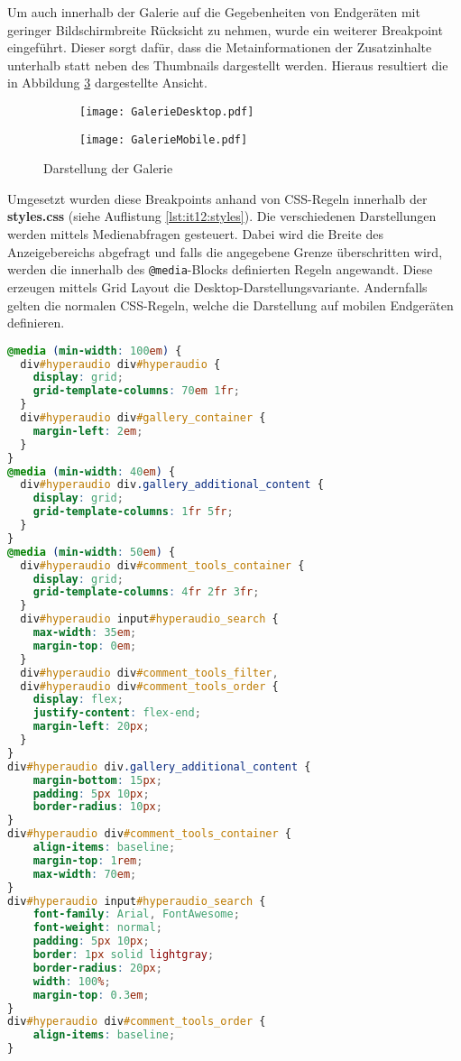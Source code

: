 Um auch innerhalb der Galerie auf die Gegebenheiten von Endgeräten mit geringer Bildschirmbreite Rücksicht zu nehmen, wurde ein weiterer Breakpoint eingeführt. Dieser sorgt dafür, dass die Metainformationen der Zusatzinhalte unterhalb statt neben des Thumbnails dargestellt werden. Hieraus resultiert die in Abbildung \ref{fig:GalerieDesktopMobile} dargestellte Ansicht.

\begin{figure}[h!]
\begin{subfigure}[c]{0.5\textwidth}
\texttt{[image: GalerieDesktop.pdf]}
\label{fig:GalerieDesktop}
\end{subfigure}%
\begin{subfigure}[c]{0.5\textwidth}
\texttt{[image: GalerieMobile.pdf]}
\label{fig:GalerieMobile}
\end{subfigure}
\caption{Darstellung der Galerie}
\label{fig:GalerieDesktopMobile}
\end{figure}

\FloatBarrier

Umgesetzt wurden diese Breakpoints anhand von CSS-Regeln innerhalb der \textbf{styles.css} (siehe Auflistung \ref{lst:it12:styles}). Die verschiedenen Darstellungen werden mittels Medienabfragen gesteuert. Dabei wird die Breite des Anzeigebereichs abgefragt und falls die angegebene Grenze überschritten wird, werden die innerhalb des \texttt{@media}-Blocks definierten Regeln angewandt. Diese  erzeugen mittels Grid Layout die Desktop-Darstellungsvariante. Andernfalls gelten die \glqq normalen\grqq{} CSS-Regeln, welche die Darstellung auf mobilen Endgeräten definieren.

\begin{lstlisting}[language=css,
             linewidth=\textwidth,
             caption={Ausschnitt der \textbf{styles.css} in der 12. Iteration},
             label={lst:it12:styles}]
@media (min-width: 100em) {
  div#hyperaudio div#hyperaudio {
    display: grid;
    grid-template-columns: 70em 1fr;
  }
  div#hyperaudio div#gallery_container {
    margin-left: 2em;
  }
}
@media (min-width: 40em) {
  div#hyperaudio div.gallery_additional_content {
    display: grid;
    grid-template-columns: 1fr 5fr;
  }
}
@media (min-width: 50em) {
  div#hyperaudio div#comment_tools_container {
    display: grid;
    grid-template-columns: 4fr 2fr 3fr;
  }
  div#hyperaudio input#hyperaudio_search {
  	max-width: 35em;
  	margin-top: 0em;
  }
  div#hyperaudio div#comment_tools_filter,
  div#hyperaudio div#comment_tools_order {
  	display: flex;
    justify-content: flex-end;
    margin-left: 20px;
  }
}
div#hyperaudio div.gallery_additional_content {
    margin-bottom: 15px;
    padding: 5px 10px;
    border-radius: 10px;
}
div#hyperaudio div#comment_tools_container {
    align-items: baseline;
    margin-top: 1rem;
    max-width: 70em;
}
div#hyperaudio input#hyperaudio_search {
    font-family: Arial, FontAwesome;
    font-weight: normal;
    padding: 5px 10px;
    border: 1px solid lightgray;
    border-radius: 20px;
    width: 100%;
    margin-top: 0.3em;
}
div#hyperaudio div#comment_tools_order {
    align-items: baseline;
}
\end{lstlisting}

